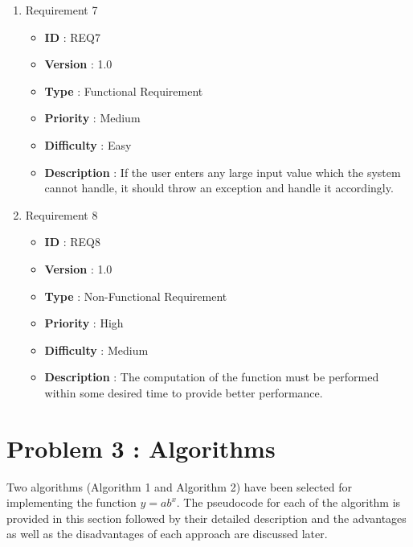 \documentclass[12pt, a4paper]{article}
\begin{document}
\begin{enumerate}
    \newpage
    
    \item{} Requirement 7
        \begin{itemize}
        \item \textbf{ID} : REQ7
        \item \textbf{Version} : 1.0
        \item \textbf{Type} : Functional Requirement
        \item \textbf{Priority} : Medium
        \item \textbf{Difficulty} : Easy
        \item \textbf{Description} : If the user enters any large input value which the system cannot handle, it should throw an exception and handle it accordingly.
        \end{itemize}
     
    \item{} Requirement 8
        \begin{itemize}
        \item \textbf{ID} : REQ8
        \item \textbf{Version} : 1.0
        \item \textbf{Type} : Non-Functional Requirement
        \item \textbf{Priority} : High
        \item \textbf{Difficulty} : Medium
        \item \textbf{Description} : The computation of the function must be performed within some desired time to provide better performance.

        \end{itemize}
    
\end{enumerate}

\newpage

\section{Problem 3 : Algorithms}

Two algorithms (Algorithm 1 and Algorithm 2) have been selected for \newline
implementing the function $y = ab^x $. The pseudocode for each of the algorithm is provided in this section followed by their detailed description and the advantages as well as the disadvantages of each approach are discussed later.
\end{document}
